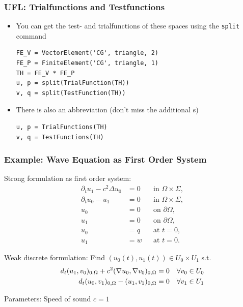\documentclass[aspectratio=169,11pt]{beamer}
\theoremstyle{definition}
\begin{document}
\begin{frame}[fragile]
  \frametitle{UFL: Trialfunctions and Testfunctions}
  \begin{itemize}
  \item You can get the test- and trialfunctions of these spaces using the
    \lstinline{split} command
  \begin{lstlisting}[basicstyle=\small, backgroundcolor=\color{listingbg}]
FE_V = VectorElement('CG', triangle, 2)
FE_P = FiniteElement('CG', triangle, 1)
TH = FE_V * FE_P
u, p = split(TrialFunction(TH))
v, q = split(TestFunction(TH))
  \end{lstlisting}
  \item There is also an abbreviation (don't miss the additional s)
    \begin{lstlisting}[basicstyle=\small, backgroundcolor=\color{listingbg}]
u, p = TrialFunctions(TH)
v, q = TestFunctions(TH)
    \end{lstlisting}
  \end{itemize}
\end{frame}

\begin{frame}
  \frametitle{Example: Wave Equation as First Order System}
  Strong formulation as first order system:
  \begin{subequations}
    \label{eq:SystemForm1}
    \begin{align*}
      \partial_t u_1 - c^2\Delta u_0 &=0 &&\text{in $\Omega\times\Sigma$},\\
      \partial_t u_0 - u_1 &=0 &&\text{in $\Omega\times\Sigma$},\\
      u_0 &= 0 &&\text{on $\partial\Omega$},\\
      u_1 &= 0 &&\text{on $\partial\Omega$},\\
      u_0 &= q &&\text{at $t=0$},\\
      u_1 &= w &&\text{at $t=0$}.
    \end{align*}
  \end{subequations}

  Weak discrete formulation: Find $(u_0(t),u_1(t))\in U_0\times U_1$ s.t.
  \begin{align*}
    d_t (u_1,v_0)_{0,\Omega} + c^2 (\nabla u_0, \nabla v_0)_{0,\Omega}
    &= 0 \quad \forall v_0 \in U_0 \notag \\
    d_t (u_0,v_1)_{0,\Omega} - (u_1,v_1)_{0,\Omega}
    &= 0 \quad \forall v_1 \in U_1
  \end{align*}

  Parameters: Speed of sound $c=1$
\end{frame}
\end{document}
